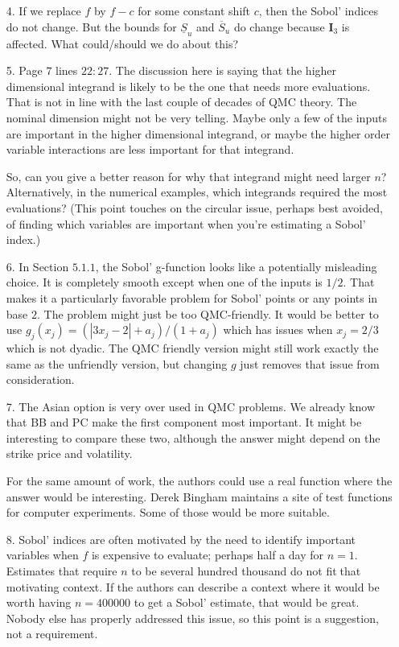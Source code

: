 \documentclass[10pt,a4paper]{article}
\newcommand{\vect}[1]{\boldsymbol{\mathbf{#1}}}
\newcommand{\vI}{\vect{I}}
\begin{document}
\begin{itemize}
\item[4.]If we replace $f$ by $f-c$ for some constant shift $c$, then the Sobol' indices do not change. But the bounds for $\underline{S}_u$ and $\overline{S}_u$ do change because $\vI_3$ is affected. What could/should we do about this?

\item[5.] Page $7$ lines $22:27$. The discussion here is saying that the higher dimensional integrand is likely to be the one that needs more evaluations. That is not in line with the last couple of decades of QMC theory. The nominal dimension might not be very telling. Maybe only a few of the inputs are important in the higher dimensional integrand, or maybe the higher order variable interactions are less important for that integrand.

So, can you give a better reason for why that integrand might need larger $n$? Alternatively, in the numerical examples, which integrands required the most evaluations?
(This point touches on the circular issue, perhaps best avoided, of finding which variables are important when you're estimating a Sobol' index.)

\item[6.] In Section $5.1.1$, the Sobol' g-function looks like a potentially misleading choice. It is completely smooth except when one of the inputs is $1/2$.
That makes it a particularly favorable problem for Sobol' points or any points in base $2$. The problem might just be too QMC-friendly. It would be better to use $g_j(x_j) = (|3x_j-2| + a_j)/(1 + a_j)$ which has issues when
$x_j = 2/3$ which is not dyadic. The QMC friendly version might still work exactly the same as the unfriendly version, but changing $g$ just removes that issue from consideration.

\item[7.] The Asian option is very over used in QMC problems. We already know that BB and PC make the first component most important. It might be interesting to compare these two, although the answer might depend on
the strike price and volatility. 

For the same amount of work, the authors could use a real function where the answer would be interesting. Derek Bingham maintains a site of test functions for computer experiments. Some of those would be more suitable.

\item[8.] Sobol' indices are often motivated by the need to identify important variables when $f$ is expensive to evaluate; perhaps half a day for $n = 1$. Estimates that require $n$ to be several hundred thousand do not fitthat motivating context. If the authors can describe a context where it would be worth having $n = 400000$ to get a Sobol' estimate, that would be great. Nobody else has properly addressed this issue, so this point is a
suggestion, not a requirement.
\end{itemize}
\end{document}
